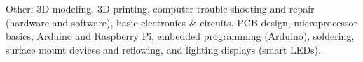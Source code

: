 \documentclass{leresume}
\begin{document}
\begin{bulletedlist}
		\item Other: 3D modeling,
                        3D printing,
                        computer trouble shooting and repair (hardware and software),
                        basic electronics \& circuits,
                        PCB design,
                        microprocessor basics,
                        Arduino and Raspberry Pi,
                        embedded programming (Arduino),
                        soldering,
                        surface mount devices and reflowing,
                        and lighting displays (smart LEDs).
                        
	\end{bulletedlist}
	

    
\end{document}
